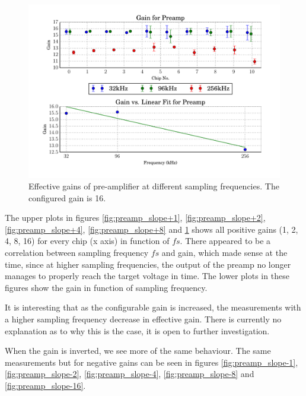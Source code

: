\begin{figure}
    \centering
    \includegraphics[width=\linewidth]{images/plots/dc_slope_preamp_gain+16.pdf}
    \caption{Effective gains of pre-amplifier at different sampling frequencies. The configured gain is 16.}
    \label{fig:preamp_slope+16}
\end{figure}

The upper plots in figures \ref{fig:preamp_slope+1}, \ref{fig:preamp_slope+2},
\ref{fig:preamp_slope+4},             \ref{fig:preamp_slope+8}             and
\ref{fig:preamp_slope+16} shows all positive  gains (1, 2, 4, 8, 16) for every
chip (x axis)  in function of $fs$. There appeared to be a correlation between
sampling frequency $fs$  and  gain,  which  made  sense  at the time, since at
higher sampling  frequencies,  the  output  of the preamp no longer manages to
properly reach the  target  voltage  in time. The lower plots in these figures
show the gain in function of sampling frequency.

It is interesting that as the configurable gain is increased, the measurements
with  a  higher  sampling frequency  decrease  in  effective  gain.  There  is
currently  no  explanation as to why this is the case, it is open  to  further
investigation.

When  the  gain  is  inverted,  we see more of the same  behaviour.  The  same
measurements    but    for   negative   gains   can   be   seen   in   figures
\ref{fig:preamp_slope-1},  \ref{fig:preamp_slope-2}, \ref{fig:preamp_slope-4},
\ref{fig:preamp_slope-8} and \ref{fig:preamp_slope-16}.


